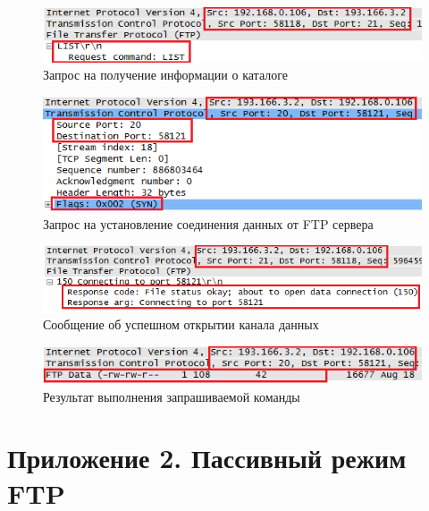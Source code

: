 \documentclass[14pt,a4paper,report]{report}
\begin{document}
\begin{figure}[h!]
	\centering
	\includegraphics[scale = 0.75]{images/ftp12.png}
	
	\caption{Запрос на получение информации о каталоге}
	\label{image:17}
\end{figure}

\begin{figure}[h!]
	\centering
	\includegraphics[scale = 0.75]{images/ftp13.png}
	
	\caption{Запрос на установление соединения данных от FTP сервера}
	\label{image:18}
\end{figure}

\clearpage

\begin{figure}[h!]
	\centering
	\includegraphics[scale = 0.75]{images/ftp14.png}
	
	\caption{Сообщение об успешном открытии канала данных}
	\label{image:19}
\end{figure}

\begin{figure}[h!]
	\centering
	\includegraphics[scale = 0.75]{images/ftp15.png}
	
	\caption{Результат выполнения запрашиваемой команды}
	\label{image:20}
\end{figure}

\section{Приложение 2. Пассивный режим FTP}
\end{document}
